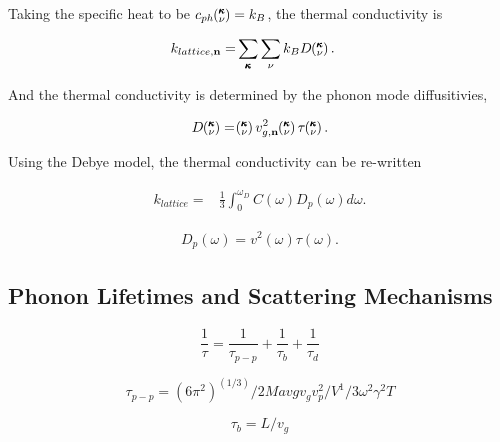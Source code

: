 \documentclass[letterpaper,12pt]{article}
\newcommand{\kv}{\mspace{-4.0mu}\left(\mspace{-8.0mu}\begin{smallmatrix}&\pmb{\kappa} \\&\nu\end{smallmatrix}\mspace{-3.0mu}\right)}
\begin{document}
Taking the specific heat to be $c_{ph} \kv = k_{B}$, the thermal conductivity is 

\begin{equation}\label{EQ:k_sum}
\begin{split}
k_{lattice,\mathbf{n}}=&\sum_{\pmb{\kappa}} \sum_\nu k_{B} D \kv.
\end{split}
\end{equation}

And the thermal conductivity is determined by the phonon mode diffusitivies,

\begin{equation}\label{EQ:k_sum}
\begin{split}
D \kv =  \kv v^{2}_{g,\mathbf{n}} \kv \tau \kv.
\end{split}
\end{equation}

Using the Debye model, the thermal conductivity can be re-written

\begin{equation}\label{EQ:k_sum}
\begin{split}
k_{lattice}=& \frac{1}{3} \int_{0}^{\omega_{D}} C(\omega) D_{p}(\omega) d\omega.
\end{split}
\end{equation}

\begin{equation}\label{EQ:k_sum}
\begin{split}
D_{p}(\omega) =  v^{2}(\omega) \tau(\omega).
\end{split}
\end{equation}


\subsection{\label{S-validation-samples}Phonon Lifetimes and Scattering Mechanisms}


\begin{equation}\label{EQ:M:tau_matthiessen}
\frac{1}{\tau} = \frac{1}{\tau_{p-p}} + \frac{1}{\tau_{b}} + \frac{1}{\tau_{d}}
\end{equation}

\begin{equation}\label{EQ:M:tau_p-p}
\tau_{p-p} = (6 \pi^2)^(1/3)/2 Mavg v_g v_p^2 / V^1/3 \omega^2 \gamma^2 T
\end{equation}

\begin{equation}\label{EQ:M:tau_b}
\tau_{b} = L/v_g
\end{equation}
\end{document}
